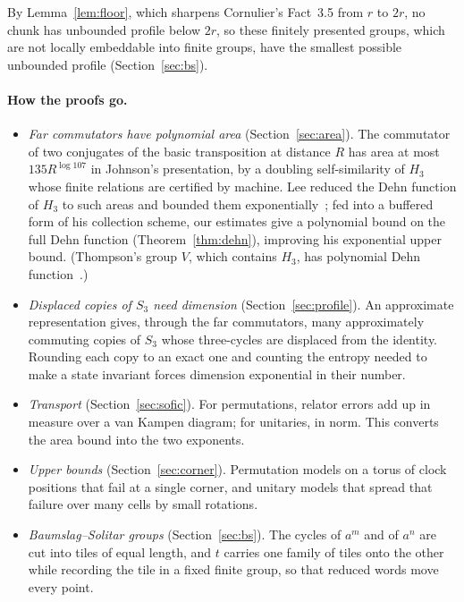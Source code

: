 \documentclass[11pt,a4paper]{article}
\theoremstyle{plain}
\theoremstyle{definition}
\theoremstyle{remark}
\begin{document}
By Lemma~\ref{lem:floor}, which sharpens Cornulier's Fact~3.5 from $r$ to $2r$, no chunk has unbounded profile below $2r$, so these
finitely presented groups, which are not locally embeddable into finite groups, have the smallest possible unbounded profile
(Section~\ref{sec:bs}).

\paragraph{How the proofs go.}
\begin{itemize}[leftmargin=1.2em,itemsep=2pt]
\item \emph{Far commutators have polynomial area} (Section~\ref{sec:area}). The commutator of two conjugates of the basic transposition at
distance $R$ has area at most $135R^{\log107}$ in Johnson's presentation, by a doubling self-similarity of $H_3$ whose finite relations are
certified by machine. Lee reduced the Dehn function of $H_3$ to such areas and bounded them exponentially~\cite[Section~4.2]{Lee2012};
fed into a buffered form of his collection scheme, our estimates give a polynomial bound on the full Dehn function
(Theorem~\ref{thm:dehn}), improving his exponential upper bound. (Thompson's group $V$, which contains $H_3$, has
polynomial Dehn function~\cite{Guba2000}.)
\item \emph{Displaced copies of $S_3$ need dimension} (Section~\ref{sec:profile}). An approximate representation gives, through the far
commutators, many approximately commuting copies of $S_3$ whose three-cycles are displaced from the identity. Rounding each copy to an
exact one and counting the entropy needed to make a state invariant forces dimension exponential in their number.
\item \emph{Transport} (Section~\ref{sec:sofic}). For permutations, relator errors add up in measure over a van Kampen diagram; for
unitaries, in norm. This converts the area bound into the two exponents.
\item \emph{Upper bounds} (Section~\ref{sec:corner}). Permutation models on a torus of clock positions that fail at a single corner, and unitary models that spread
that failure over many cells by small rotations.
\item \emph{Baumslag--Solitar groups} (Section~\ref{sec:bs}). The cycles of $a^m$ and of $a^n$ are cut into tiles of equal length, and $t$
carries one family of tiles onto the other while recording the tile in a fixed finite group, so that reduced words move every point.
\end{itemize}
\end{document}
